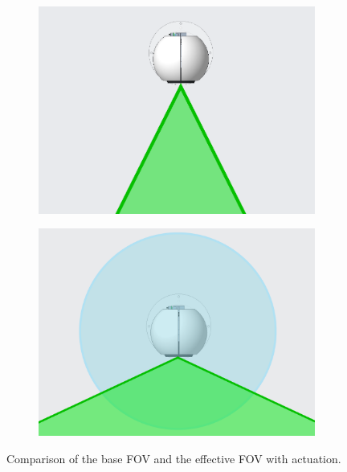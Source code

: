 \begin{figure}
    \centering
    \begin{subfigure}{0.4\linewidth}
        \includegraphics[width=\linewidth]{Thesis/ch5/old-fov.png}
        \caption{}
        \label{fig:basic-fov}
    \end{subfigure}
    \begin{subfigure}{0.4\linewidth}
        \includegraphics[width=\linewidth]{Thesis/ch5/new-fov.png}
        \caption{}
        \label{fig:actuated}
    \end{subfigure}
    \caption{Comparison of the base FOV and the effective FOV with actuation.}
    \label{fig:fov}
\end{figure}

